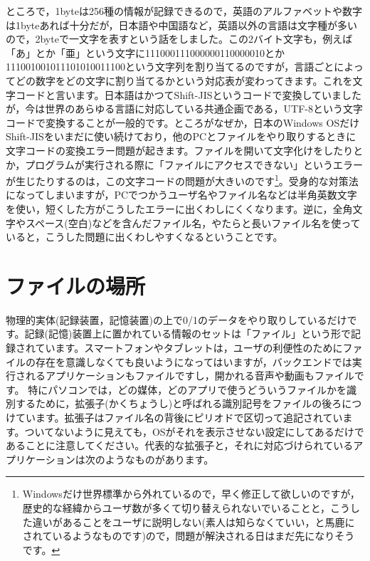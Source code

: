 \documentclass{ltjsbook}
\begin{document}
ところで，1byteは256種の情報が記録できるので，英語のアルファベットや数字は1byteあれば十分だが，日本語や中国語など，英語以外の言語は文字種が多いので，2byteで一文字を表すという話をしました。この2バイト文字も，例えば「あ」とか「亜」という文字に111000111000000110000010とか111001001011101010011100という文字列を割り当てるのですが，言語ごとによってどの数字をどの文字に割り当てるかという対応表が変わってきます。これを文字コードと言います。日本語はかつてShift-JISというコードで変換していましたが，今は世界のあらゆる言語に対応している共通企画である，UTF-8という文字コードで変換することが一般的です。ところがなぜか，日本のWindows OSだけShift-JISをいまだに使い続けており，他のPCとファイルをやり取りするときに文字コードの変換エラー問題が起きます。ファイルを開いて文字化けをしたりとか，プログラムが実行される際に「ファイルにアクセスできない」というエラーが生じたりするのは，この文字コードの問題が大きいのです\footnote{Windowsだけ世界標準から外れているので，早く修正して欲しいのですが，歴史的な経緯からユーザ数が多くて切り替えられないでいることと，こうした違いがあることをユーザに説明しない(素人は知らなくていい，と馬鹿にされているようなものです)ので，問題が解決される日はまだ先になりそうです。}。受身的な対策法になってしまいますが，PCでつかうユーザ名やファイル名などは半角英数文字を使い，短くした方がこうしたエラーに出くわしにくくなります。逆に，全角文字やスペース(空白)などを含んだファイル名，やたらと長いファイル名を使っていると，こうした問題に出くわしやすくなるということです。


\section{ファイルの場所}
\label{suffix}
物理的実体(記録装置，記憶装置)の上で0/1のデータをやり取りしているだけです。記録(記憶)装置上に置かれている情報のセットは「ファイル」という形で記録されています。スマートフォンやタブレットは，ユーザの利便性のためにファイルの存在を意識しなくても良いようになってはいますが，バックエンドでは実行されるアプリケーションもファイルですし，開かれる音声や動画もファイルです。
特にパソコンでは，どの媒体，どのアプリで使うどういうファイルかを識別するために，拡張子(かくちょうし)と呼ばれる識別記号をファイルの後ろにつけています。拡張子はファイル名の背後にピリオドで区切って追記されています。ついてないように見えても，OSがそれを表示させない設定にしてあるだけであることに注意してください。代表的な拡張子と，それに対応づけられているアプリケーションは次のようなものがあります。
\end{document}
